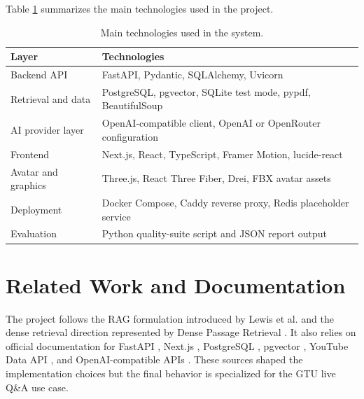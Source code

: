 Table \ref{tab:technology-stack} summarizes the main technologies used in the project.

\begin{table}[!htbp]
    \centering
    \caption{\label{tab:technology-stack}Main technologies used in the system.}
    \begin{tabularx}{\textwidth}{lX}
        \toprule
        Layer & Technologies \\
        \midrule
        Backend API & FastAPI, Pydantic, SQLAlchemy, Uvicorn \\
        Retrieval and data & PostgreSQL, pgvector, SQLite test mode, pypdf, BeautifulSoup \\
        AI provider layer & OpenAI-compatible client, OpenAI or OpenRouter configuration \\
        Frontend & Next.js, React, TypeScript, Framer Motion, lucide-react \\
        Avatar and graphics & Three.js, React Three Fiber, Drei, FBX avatar assets \\
        Deployment & Docker Compose, Caddy reverse proxy, Redis placeholder service \\
        Evaluation & Python quality-suite script and JSON report output \\
        \bottomrule
    \end{tabularx}
\end{table}

\section{Related Work and Documentation}

The project follows the RAG formulation introduced by Lewis et al. \cite{lewis2020rag} and the dense retrieval direction represented by Dense Passage Retrieval \cite{karpukhin2020dpr}. It also relies on official documentation for FastAPI \cite{fastapi}, Next.js \cite{nextjs}, PostgreSQL \cite{postgresql}, pgvector \cite{pgvector}, YouTube Data API \cite{youtubeapi}, and OpenAI-compatible APIs \cite{openaiapi}. These sources shaped the implementation choices but the final behavior is specialized for the GTU live Q\&A use case.
